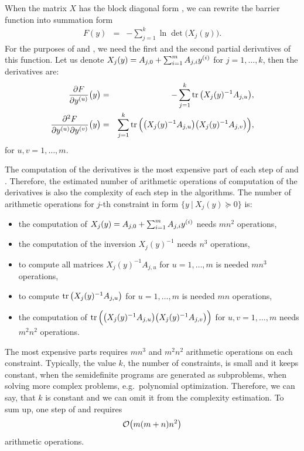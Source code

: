 When the matrix $X$ has the block diagonal form , we can rewrite the barrier function  into summation form
\begin{eqnarray}
  F(y) &=& -\sum_{j=1}^k \ln\det\big(X_j(y)\big).
\end{eqnarray}
For the purposes of  and , we need the first and the second partial derivatives of this function.
Let us denote $X_j(y) = A_{j, 0} + \sum_{i=1}^mA_{j, i}y^{(i)}$ for $j = 1, \ldots, k$, then the derivatives are:
\begin{eqnarray}
  \frac{\partial F}{\partial y^{(u)}}\big(y\big) &=& -\sum_{j=1}^k \operatorname{tr}\big(X_j(y)^{-1}A_{j,u}\big),\\
  \frac{\partial^2 F}{\partial y^{(u)} \partial y^{(v)}}\big(y\big) &=& \sum_{j=1}^k \operatorname{tr}\Big(\big(X_j(y)^{-1}A_{j,u}\big)\big(X_j(y)^{-1}A_{j,v}\big)\Big),
\end{eqnarray}
for $u, v = 1,\ldots, m$.

The computation of the derivatives is the most expensive part of each step of  and .
Therefore, the estimated number of arithmetic operations of computation of the derivatives is also the complexity of each step in the algorithms.
The number of arithmetic operations for $j$-th constraint in form $\big\{y\ |\ X_j(y) \succeq 0\big\}$ is:
\begin{itemize}
  \item the computation of $X_j(y) = A_{j,0} + \sum_{i=1}^mA_{j,i}y^{(i)}$ needs $mn^2$ operations,
  \item the computation of the inversion $X_j(y)^{-1}$ needs $n^3$ operations,
  \item to compute all matrices $X_j(y)^{-1}A_{j,u}$ for $u = 1,\ldots,m$ is needed $mn^3$ operations,
  \item to compute $\operatorname{tr}\big(X_j(y)^{-1}A_{j,u}\big)$ for $u = 1,\ldots,m$ is needed $mn$ operations,
  \item the computation of $\operatorname{tr}\Big(\big(X_j(y)^{-1}A_{j,u}\big)\big(X_j(y)^{-1}A_{j,v}\big)\Big)$ for $u, v = 1,\ldots, m$ needs $m^2n^2$ operations.
\end{itemize}
The most expensive parts requires $mn^3$ and $m^2n^2$ arithmetic operations on each constraint.
Typically, the value $k$, the number of constraints, is small and it keeps constant, when the semidefinite programs are generated as subproblems, when solving more complex problems, e.g.\ polynomial optimization. Therefore, we can say, that $k$ is constant and we can omit it from the complexity estimation.
To sum up, one step of  and  requires
\begin{eqnarray}
  \mathcal{O}\big(m(m+n)n^2\big)\labeleq{SDP:bf:O}
\end{eqnarray}
arithmetic operations.

